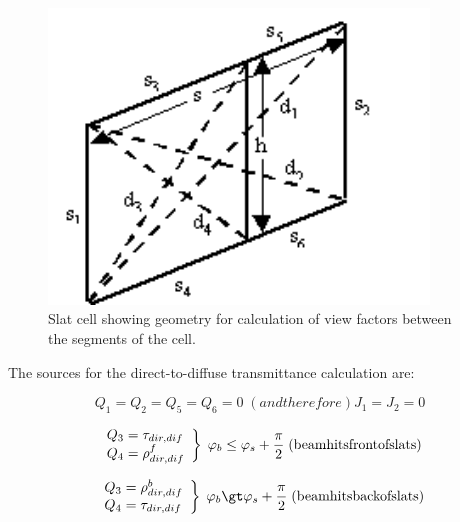 \begin{figure}[hbtp] %
\centering
\includegraphics[width=0.9\textwidth, height=0.9\textheight, keepaspectratio=true]{media/image1063.png}
\caption{Slat cell showing geometry for calculation of view factors between the segments of the cell. \protect \label{fig:slat-cell-showing-geometry-for-calculation-of}}
\end{figure}

The sources for the direct-to-diffuse transmittance calculation are:

\begin{equation}
{Q_1} = {Q_2} = {Q_5} = {Q_6} = 0 \;  (and therefore) {J_1} = {J_2} = 0
\end{equation}

\begin{equation}
\left. 
    \begin{array}{l}
      Q_3 = \tau_{dir,dif} \\
      Q_4 = \rho_{dir,dif}^f 
    \end{array} 
  \right\} 
  \;
  \varphi_b \le \varphi_s + \frac{\pi }{2} 
  \;
  \rm{ (beam hits front of slats)}
\end{equation}

\begin{equation}
\left.
    \begin{array}{l}
      Q_3 = \rho_{dir,dif}^b \\
      Q_4 = \tau_{dir,dif}
    \end{array}
  \right\}
  \;
  \varphi_b \gt \varphi_s + \frac{\pi }{2}
  \;
  \rm{ (beam hits back of slats)}
\end{equation}

